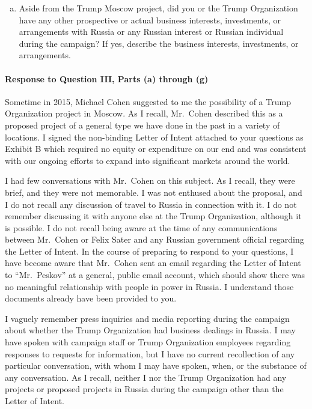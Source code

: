 \begin{enumerate}[a.]
\item Aside from the Trump Moscow project, did you or the Trump Organization have any other prospective or actual business interests, investments, or arrangements with Russia or any Russian interest or Russian individual during the campaign?
If yes, describe the business interests, investments, or arrangements.

\end{enumerate}

\paragraph*{Response to Question III, Parts (a) through (g)}

Sometime in 2015, Michael Cohen suggested to me the possibility of a Trump Organization project in Moscow.
As I recall, Mr.~Cohen described this as a proposed project of a general type we have done in the past in a variety of locations.
I signed the non-binding Letter of Intent attached to your questions as Exhibit B which required no equity or expenditure on our end and was consistent with our ongoing efforts to expand into significant markets around the world.

I had few conversations with Mr.~Cohen on this subject.
As I recall, they were brief, and they were not memorable.
I was not enthused about the proposal, and I do not recall any discussion of travel to Russia in connection with it.
I do not remember discussing it with anyone else at the Trump Organization, although it is possible.
I do not recall being aware at the time of any communications between Mr.~Cohen or Felix Sater and any Russian government official regarding the Letter of Intent.
In the course of preparing to respond to your questions, I have become aware that Mr.~Cohen sent an email regarding the Letter of Intent to “Mr.~Peskov” at a general, public email account, which should show there was no meaningful relationship with people in power in Russia.
I understand those documents already have been provided to you.

I vaguely remember press inquiries and media reporting during the campaign about whether the Trump Organization had business dealings in Russia.
I may have spoken with campaign staff or Trump Organization employees regarding responses to requests for information, but I have no current recollection of any particular conversation, with whom I may have spoken, when, or the substance of any conversation.
As I recall, neither I nor the Trump Organization had any projects or proposed projects in Russia during the campaign other than the Letter of Intent.

